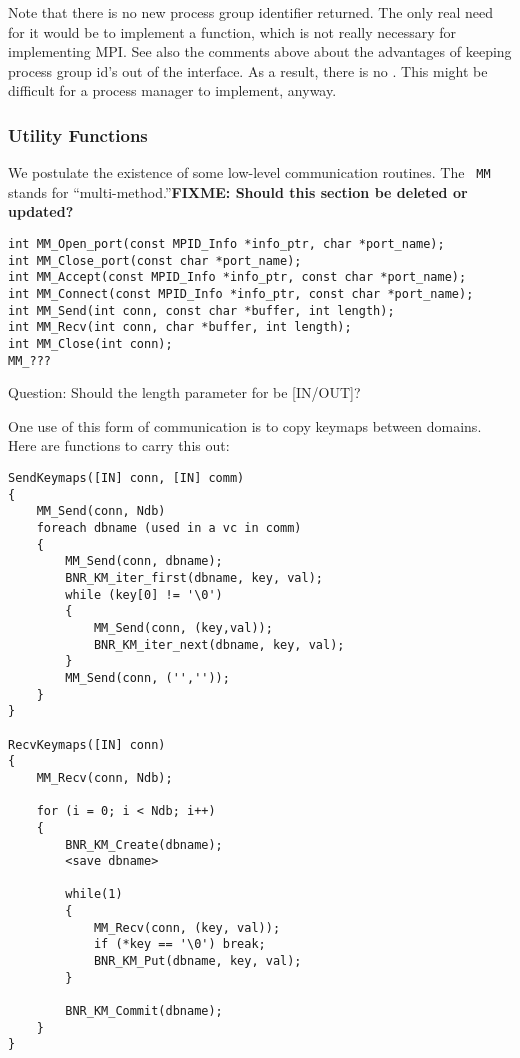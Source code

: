 \documentclass{article}
\def\fixme#1{\marginpar{FIXME:}\textbf{FIXME: #1}}
\begin{document}
Note that there is no new process group identifier returned.  The only real
need for it would be to implement a  function, which is not
really necessary for implementing MPI.  See also the comments above about the
advantages of keeping process group id's out of the interface.  As a result,
there is no .  This might be difficult for a process manager to
implement, anyway. 

\subsubsection{Utility Functions}

We postulate the existence of some low-level communication routines.  The {\tt
  MM} stands for ``multi-method.''\fixme{Should this section be
  deleted or updated?}

\begin{verbatim}
int MM_Open_port(const MPID_Info *info_ptr, char *port_name);
int MM_Close_port(const char *port_name);
int MM_Accept(const MPID_Info *info_ptr, const char *port_name);
int MM_Connect(const MPID_Info *info_ptr, const char *port_name);
int MM_Send(int conn, const char *buffer, int length);
int MM_Recv(int conn, char *buffer, int length);
int MM_Close(int conn);
MM_???
\end{verbatim}
Question: Should the length parameter for  be [IN/OUT]?

One use of this form of communication is to copy keymaps between domains.
Here are functions to carry this out:

\begin{verbatim}
SendKeymaps([IN] conn, [IN] comm)
{
    MM_Send(conn, Ndb)
    foreach dbname (used in a vc in comm)
    {
        MM_Send(conn, dbname);
        BNR_KM_iter_first(dbname, key, val);
        while (key[0] != '\0')
        {
            MM_Send(conn, (key,val));
            BNR_KM_iter_next(dbname, key, val);
        }
        MM_Send(conn, ('',''));
    }
}

RecvKeymaps([IN] conn)
{
    MM_Recv(conn, Ndb);
    
    for (i = 0; i < Ndb; i++)
    {
        BNR_KM_Create(dbname);
        <save dbname>
        
        while(1)
        {
            MM_Recv(conn, (key, val));
            if (*key == '\0') break;
            BNR_KM_Put(dbname, key, val);
        }

        BNR_KM_Commit(dbname);
    }
}
\end{verbatim}
\end{document}
